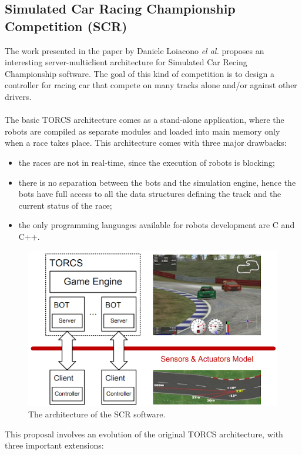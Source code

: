 \subsection{Simulated Car Racing Championship Competition (SCR)}\label{scr}
The work presented in the paper by Daniele Loiacono \textit{el al.} proposes an interesting server-multiclient architecture for Simulated Car Recing Championship software. The goal of this kind of competition is to design a controller for racing car that compete on many tracks alone and/or against other drivers. \\ \\
The basic TORCS architecture comes as a stand-alone application, where the robots are compiled as separate modules and loaded into main memory only when a race takes place. This architecture comes with three major drawbacks:
\begin{itemize}
	\item the races are not in real-time, since the execution of robots is blocking;
	\item there is no separation between the bots and the simulation engine, hence the bots have full access to all the data structures defining the track and the current status of the race;
	\item the only programming languages available for robots development are C and C++.
\end{itemize}
\begin{figure}[h!]
	\centering
	\includegraphics[width=0.75\linewidth]{"immagini/Feasibility study/SCR-architecture"}
	\caption[The architecture of the SCR software.]{The architecture of the SCR software.}
	\label{fig:scr-architecture}
\end{figure}
This proposal involves an evolution of the original TORCS architecture, with three important extensions:
